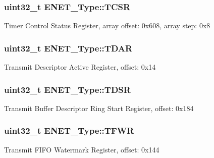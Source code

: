 \subsubsection[{\texorpdfstring{T\+C\+SR}{TCSR}}]{ uint32\+\_\+t E\+N\+E\+T\+\_\+\+Type\+::\+T\+C\+SR}\hypertarget{structENET__Type_a344e4cceb1173e0a567e912c33b50b23}{}\label{structENET__Type_a344e4cceb1173e0a567e912c33b50b23}
Timer Control Status Register, array offset\+: 0x608, array step\+: 0x8 
\subsubsection[{\texorpdfstring{T\+D\+AR}{TDAR}}]{ uint32\+\_\+t E\+N\+E\+T\+\_\+\+Type\+::\+T\+D\+AR}\hypertarget{structENET__Type_aa4673b3f5276bced67de7715389a098f}{}\label{structENET__Type_aa4673b3f5276bced67de7715389a098f}
Transmit Descriptor Active Register, offset\+: 0x14 
\subsubsection[{\texorpdfstring{T\+D\+SR}{TDSR}}]{ uint32\+\_\+t E\+N\+E\+T\+\_\+\+Type\+::\+T\+D\+SR}\hypertarget{structENET__Type_aaa3290b03f8c1eeec24b72eccb514cef}{}\label{structENET__Type_aaa3290b03f8c1eeec24b72eccb514cef}
Transmit Buffer Descriptor Ring Start Register, offset\+: 0x184 
\subsubsection[{\texorpdfstring{T\+F\+WR}{TFWR}}]{ uint32\+\_\+t E\+N\+E\+T\+\_\+\+Type\+::\+T\+F\+WR}\hypertarget{structENET__Type_aca4cd89cda56d27b449736abfdd69ee6}{}\label{structENET__Type_aca4cd89cda56d27b449736abfdd69ee6}
Transmit F\+I\+FO Watermark Register, offset\+: 0x144 
